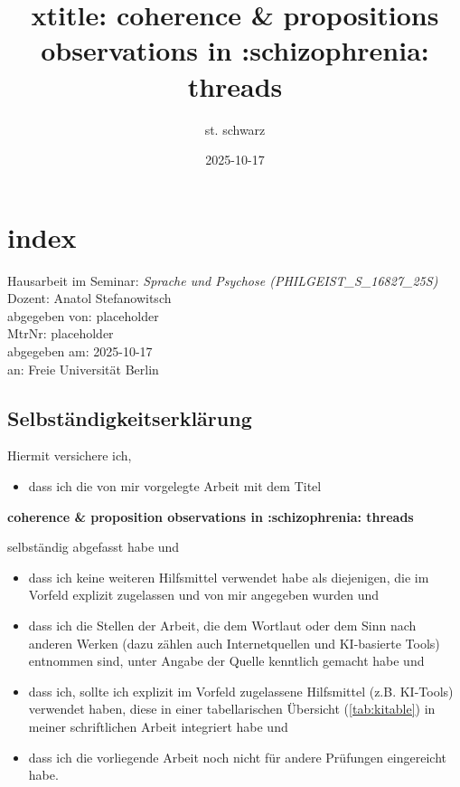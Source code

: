\documentclass[
  12pt,
  oneside]{book}
\title{xtitle: coherence \& propositions observations in :schizophrenia: threads}
\author{st. schwarz}
\date{2025-10-17}
\providecommand{\tightlist}{%
  \setlength{\itemsep}{0pt}\setlength{\parskip}{0pt}}
\begin{document}
\maketitle

{
\setcounter{tocdepth}{1}
\tableofcontents
}
\chapter{index}\label{index}

Hausarbeit im Seminar: \emph{Sprache und Psychose (PHILGEIST\_S\_16827\_25S)}\\
Dozent: Anatol Stefanowitsch\\
abgegeben von: placeholder\\
MtrNr: placeholder\\
abgegeben am: 2025-10-17\\
an: Freie Universität Berlin

\section{Selbständigkeitserklärung}\label{selbstuxe4ndigkeitserkluxe4rung}

Hiermit versichere ich,

\begin{itemize}
\tightlist
\item
  dass ich die von mir vorgelegte Arbeit mit dem Titel
\end{itemize}

\textbf{coherence \& proposition observations in :schizophrenia: threads}

selbständig abgefasst habe und

\begin{itemize}
\tightlist
\item
  dass ich keine weiteren Hilfsmittel verwendet habe als diejenigen, die im Vorfeld explizit zugelassen und von mir angegeben wurden und
\item
  dass ich die Stellen der Arbeit, die dem Wortlaut oder dem Sinn nach anderen Werken (dazu zählen auch Internetquellen und KI-basierte Tools) entnommen sind, unter Angabe der Quelle kenntlich gemacht habe und
\item
  dass ich, sollte ich explizit im Vorfeld zugelassene Hilfsmittel (z.B. KI-Tools) verwendet haben, diese in einer tabellarischen Übersicht (\ref{tab:kitable}) in meiner schriftlichen Arbeit integriert habe und
\item
  dass ich die vorliegende Arbeit noch nicht für andere Prüfungen eingereicht habe.
\end{itemize}
\end{document}
